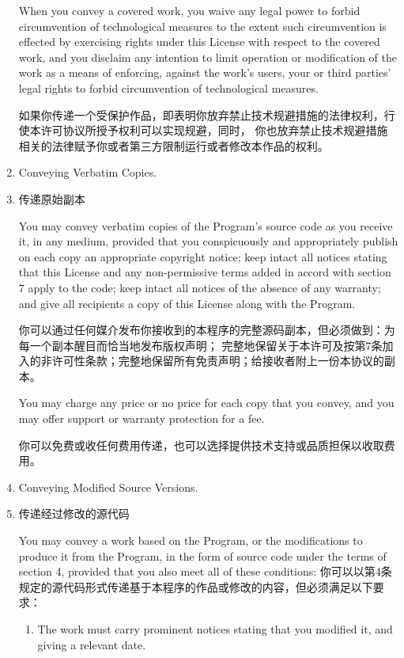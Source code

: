 \documentclass[11pt]{article}
\begin{document}
\begin{enumerate}
        When you convey a covered work, you waive any legal power to forbid
        circumvention of technological measures to the extent such circumvention
        is effected by exercising rights under this License with respect to
        the covered work, and you disclaim any intention to limit operation or
        modification of the work as a means of enforcing, against the work's
        users, your or third parties' legal rights to forbid circumvention of
        technological measures.

        如果你传递一个受保护作品，即表明你放弃禁止技术规避措施的法律权利，行使本许可协议所授予权利可以实现规避，同时，
        你也放弃禁止技术规避措施相关的法律赋予你或者第三方限制运行或者修改本作品的权利。

  \item Conveying Verbatim Copies.
  \item 传递原始副本

        You may convey verbatim copies of the Program's source code as you
        receive it, in any medium, provided that you conspicuously and
        appropriately publish on each copy an appropriate copyright notice;
        keep intact all notices stating that this License and any
        non-permissive terms added in accord with section 7 apply to the code;
        keep intact all notices of the absence of any warranty; and give all
        recipients a copy of this License along with the Program.

        你可以通过任何媒介发布你接收到的本程序的完整源码副本，但必须做到：为每一个副本醒目而恰当地发布版权声明；
        完整地保留关于本许可及按第7条加入的非许可性条款；完整地保留所有免责声明；给接收者附上一份本协议的副本。


        You may charge any price or no price for each copy that you convey,
        and you may offer support or warranty protection for a fee.

        你可以免费或收任何费用传递，也可以选择提供技术支持或品质担保以收取费用。

  \item Conveying Modified Source Versions.
  \item 传递经过修改的源代码

        You may convey a work based on the Program, or the modifications to
        produce it from the Program, in the form of source code under the
        terms of section 4, provided that you also meet all of these conditions:
        你可以以第4条规定的源代码形式传递基于本程序的作品或修改的内容，但必须满足以下要求：
        \begin{enumerate}
          \item The work must carry prominent notices stating that you modified
                it, and giving a relevant date.


\end{enumerate}
\end{enumerate}
\end{document}
